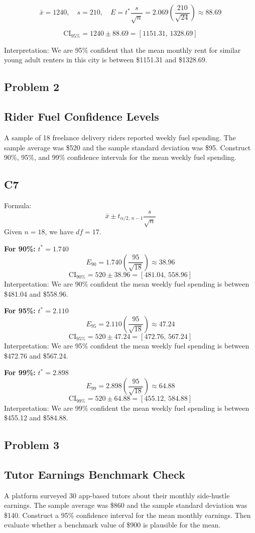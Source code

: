 \[
\bar{x}=1240,\quad s=210,\quad E=t^*\frac{s}{\sqrt{n}}=2.069\left(\frac{210}{\sqrt{24}}\right)\approx 88.69
\]

\[
\text{CI}_{95\%}=1240\pm 88.69=[1151.31,\,1328.69]
\]

Interpretation: We are 95\% confident that the mean monthly rent for similar young adult renters in this city is between \$1151.31 and \$1328.69.

\subsection*{Problem 2}
\subsection*{Rider Fuel Confidence Levels}
A sample of 18 freelance delivery riders reported weekly fuel spending. The sample average was \$520 and the sample standard deviation was \$95. Construct 90\%, 95\%, and 99\% confidence intervals for the mean weekly fuel spending.

\subsection*{C7}
Formula:
\[
\bar{x} \pm t_{\alpha/2,\,n-1}\frac{s}{\sqrt{n}}
\]
Given \(n=18\), we have \(df=17\).

\textbf{For 90\%:} \(t^*=1.740\)
\[
E_{90}=1.740\left(\frac{95}{\sqrt{18}}\right)\approx 38.96
\]
\[
\text{CI}_{90\%}=520\pm 38.96=[481.04,\,558.96]
\]
Interpretation: We are 90\% confident the mean weekly fuel spending is between \$481.04 and \$558.96.

\textbf{For 95\%:} \(t^*=2.110\)
\[
E_{95}=2.110\left(\frac{95}{\sqrt{18}}\right)\approx 47.24
\]
\[
\text{CI}_{95\%}=520\pm 47.24=[472.76,\,567.24]
\]
Interpretation: We are 95\% confident the mean weekly fuel spending is between \$472.76 and \$567.24.

\textbf{For 99\%:} \(t^*=2.898\)
\[
E_{99}=2.898\left(\frac{95}{\sqrt{18}}\right)\approx 64.88
\]
\[
\text{CI}_{99\%}=520\pm 64.88=[455.12,\,584.88]
\]
Interpretation: We are 99\% confident the mean weekly fuel spending is between \$455.12 and \$584.88.

\subsection*{Problem 3}
\subsection*{Tutor Earnings Benchmark Check}
A platform surveyed 30 app-based tutors about their monthly side-hustle earnings. The sample average was \$860 and the sample standard deviation was \$140. Construct a 95\% confidence interval for the mean monthly earnings. Then evaluate whether a benchmark value of \$900 is plausible for the mean.

